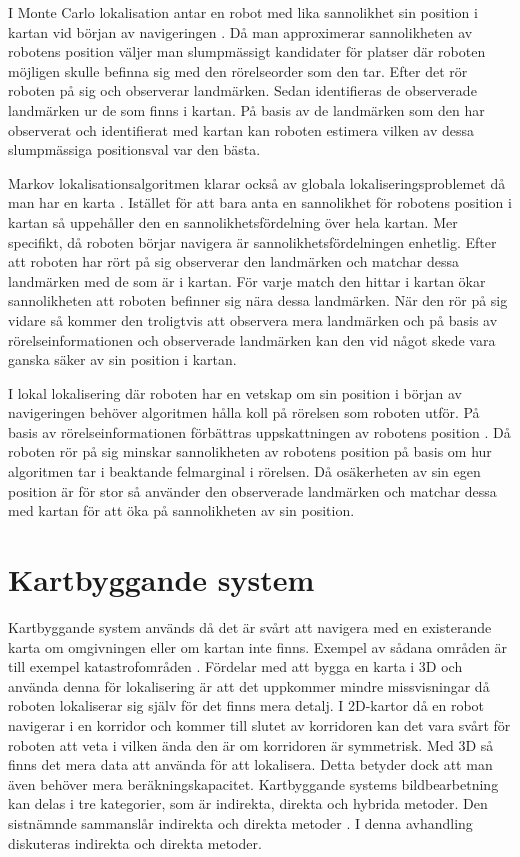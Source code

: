 I Monte Carlo lokalisation antar en robot med lika sannolikhet sin position i kartan vid början av navigeringen \citep{montecarlo}. Då man approximerar sannolikheten av robotens position väljer man slumpmässigt kandidater för platser där roboten möjligen skulle befinna sig med den rörelseorder som den tar. Efter det rör roboten på sig och observerar landmärken. Sedan identifieras de observerade landmärken ur de som finns i kartan. På basis av de landmärken som den har observerat och identifierat med kartan kan roboten estimera vilken av dessa slumpmässiga positionsval var den bästa. 

Markov lokalisationsalgoritmen klarar också av globala lokaliseringsproblemet då man har en karta \citep{ProbabilisticRobotics}. Istället för att bara anta en sannolikhet för robotens position i kartan så uppehåller den en sannolikhetsfördelning över hela kartan. Mer specifikt, då roboten börjar navigera är sannolikhetsfördelningen enhetlig. Efter att roboten har rört på sig observerar den landmärken och matchar dessa landmärken med de som är i kartan. För varje match den hittar i kartan ökar sannolikheten att roboten befinner sig nära dessa landmärken. När den rör på sig vidare så kommer den troligtvis att observera mera landmärken och på basis av rörelseinformationen och observerade landmärken kan den vid något skede vara ganska säker av sin position i kartan.

I lokal lokalisering där roboten har en vetskap om sin position i början av navigeringen behöver algoritmen hålla koll på rörelsen som roboten utför. På basis av rörelseinformationen förbättras uppskattningen av robotens position \citep{montecarlo,ProbabilisticRobotics}. Då roboten rör på sig minskar sannolikheten av robotens position på basis om hur algoritmen tar i beaktande felmarginal i rörelsen. Då osäkerheten av sin egen position är för stor så använder den observerade landmärken och matchar dessa med kartan för att öka på sannolikheten av sin position. 

\section{Kartbyggande system}

Kartbyggande system används då det är svårt att navigera med en existerande karta om omgivningen eller om kartan inte finns. Exempel av sådana områden är till exempel katastrofområden \citep{geospatial}. Fördelar med att bygga en karta i 3D och använda denna för lokalisering är att det uppkommer mindre missvisningar då roboten lokaliserar sig själv för det finns mera detalj. I 2D-kartor då en robot navigerar i en korridor och kommer till slutet av korridoren kan det vara svårt för roboten att veta i vilken ända den är om korridoren är symmetrisk. Med 3D så finns det mera data att använda för att lokalisera. Detta betyder dock att man även behöver mera beräkningskapacitet. Kartbyggande systems bildbearbetning kan delas i tre kategorier, som är indirekta, direkta och hybrida metoder. Den sistnämnde sammanslår indirekta och direkta metoder \citep{geospatial}. I denna avhandling diskuteras indirekta och direkta metoder.

